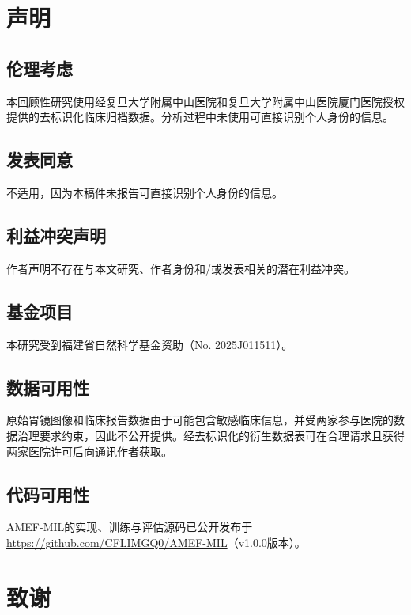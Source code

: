 \documentclass[Afour,sagev,times]{sagej}
\begin{document}
\section*{声明}

\subsection*{伦理考虑}

本回顾性研究使用经复旦大学附属中山医院和复旦大学附属中山医院厦门医院授权提供的去标识化临床归档数据。分析过程中未使用可直接识别个人身份的信息。

\subsection*{发表同意}

不适用，因为本稿件未报告可直接识别个人身份的信息。

\subsection*{利益冲突声明}

作者声明不存在与本文研究、作者身份和/或发表相关的潜在利益冲突。

\subsection*{基金项目}

本研究受到福建省自然科学基金资助（No. 2025J011511）。

\subsection*{数据可用性}

原始胃镜图像和临床报告数据由于可能包含敏感临床信息，并受两家参与医院的数据治理要求约束，因此不公开提供。经去标识化的衍生数据表可在合理请求且获得两家医院许可后向通讯作者获取。

\subsection*{代码可用性}

AMEF-MIL的实现、训练与评估源码已公开发布于\href{https://github.com/CFLIMGQ0/AMEF-MIL}{https://github.com/CFLIMGQ0/AMEF-MIL}（v1.0.0版本）。

\section*{致谢}
\end{document}
